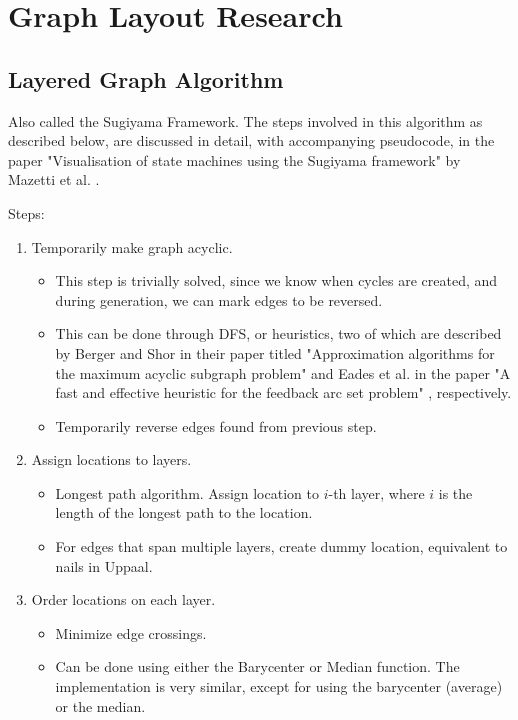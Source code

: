 \section{Graph Layout Research}


\subsection{Layered Graph Algorithm}
Also called the Sugiyama Framework. The steps involved in this algorithm as described below, are discussed in detail, with accompanying pseudocode, in the paper "Visualisation of state machines using the Sugiyama framework" by Mazetti et al. \cite{Mazetti2012}.
\noindent

Steps:
\begin{enumerate}
    \item Temporarily make graph acyclic.
          \begin{itemize}
              \item This step is trivially solved, since we know when cycles are created, and during generation, we can mark edges to be reversed.
              \item This can be done through DFS, or heuristics, two of which are described by Berger and Shor in their paper titled "Approximation algorithms for the maximum acyclic subgraph problem" \cite{Berger1990} and Eades et al. in the paper "A fast and effective heuristic for the feedback arc set problem" \cite{Eades1993}, respectively.
              \item Temporarily reverse edges found from previous step.
          \end{itemize}
    \item Assign locations to layers.
          \begin{itemize}
              \item Longest path algorithm. Assign location to $i$-th layer, where $i$ is the length of the longest path to the location.
              \item For edges that span multiple layers, create dummy location, equivalent to nails in Uppaal.
          \end{itemize}
    \item Order locations on each layer.
          \begin{itemize}
              \item Minimize edge crossings.
              \item Can be done using either the Barycenter or Median function. The implementation is very similar, except for using the barycenter (average) or the median.

\end{itemize}
\end{enumerate}
